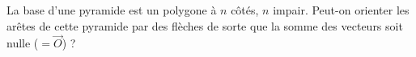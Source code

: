 La base d'une pyramide est un polygone à $n$ côtés, $n$ impair. Peut-on orienter les arêtes de cette pyramide par des flèches de sorte que la somme des vecteurs soit nulle ($= \vec O$) ?
